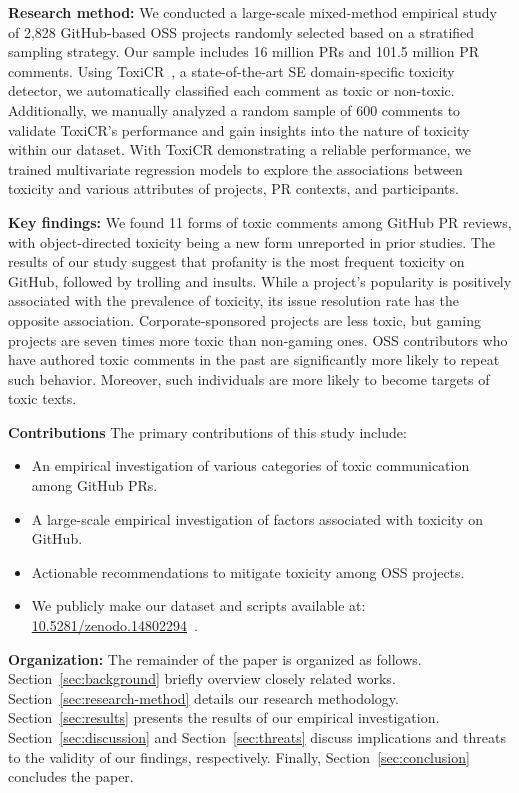 \vspace{2pt}
\noindent \textbf{Research method:} We conducted a large-scale mixed-method empirical study of 2,828 GitHub-based OSS projects randomly selected based on a stratified sampling strategy. Our sample includes 16 million PRs and 101.5 million PR comments.  Using ToxiCR~\cite{sarker2022automated}, a state-of-the-art SE domain-specific toxicity detector, we automatically classified each comment as toxic or non-toxic. Additionally, we manually analyzed a random sample of 600 comments to validate ToxiCR's performance and gain insights into the nature of toxicity within our dataset. With ToxiCR demonstrating a reliable performance, we trained multivariate regression models to explore the associations between toxicity and various attributes of projects, PR contexts, and participants. 


\vspace{2pt}
\noindent \textbf{Key findings:}
We found 11 forms of toxic comments among GitHub PR reviews, with object-directed toxicity being a new form unreported in prior studies. 
The results of our study suggest that profanity is the most frequent toxicity on GitHub, followed by trolling and insults. 
While a project's popularity is positively associated with the prevalence of toxicity, its issue resolution rate has the opposite association.
Corporate-sponsored projects are less toxic, but gaming projects are seven times more toxic than non-gaming ones. OSS contributors who have authored toxic comments in the past are significantly more likely to repeat such behavior. Moreover, such individuals are more likely to become targets of toxic texts.



\vspace{4pt}
\noindent \textbf{Contributions} The primary contributions of this study include:
\begin{itemize}
\item  An empirical investigation of various categories of toxic communication among GitHub {PRs}.
\item  A large-scale empirical investigation of factors associated with toxicity on GitHub.
\item Actionable recommendations to mitigate toxicity among OSS projects. 

\item  We publicly make our dataset and scripts available at: \hyperlink{https://doi.org/10.5281/zenodo.14802294}{10.5281/zenodo.14802294}~\cite{dataset}.
 
\end{itemize}



\vspace{2pt}
\noindent \textbf{Organization:} The remainder of the paper is organized as follows.
Section~\ref{sec:background} briefly overview closely related works.
Section~\ref{sec:research-method} details our research methodology.  
 Section~\ref{sec:results} presents the results of our empirical investigation.  
 Section~\ref{sec:discussion} and Section~\ref{sec:threats} discuss implications and threats to the validity of our findings, respectively. 
 Finally, Section~\ref{sec:conclusion} concludes the paper.
